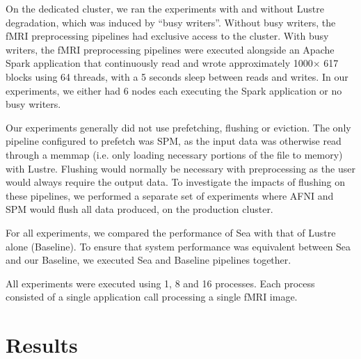 \documentclass[pdflatex,sn-mathphys-num]{sn-jnl}
\theoremstyle{thmstyleone}%
\theoremstyle{thmstyletwo}%
\theoremstyle{thmstylethree}%
\begin{document}
    On the dedicated cluster, we ran the experiments with and without
    Lustre degradation, which was induced by ``busy writers''. Without busy
    writers, the fMRI preprocessing pipelines had exclusive access to the
    cluster. With busy writers, the fMRI preprocessing pipelines were executed
    alongside an Apache Spark application that continuously read and wrote approximately
    1000$\times$ \SI{617}{\mebi\byte} blocks using 64 threads, with a 5 seconds sleep between reads
    and writes. In our experiments, we either had 6 nodes each executing the
    Spark application or no busy writers.

    Our experiments generally did not use prefetching, flushing or eviction. The
    only pipeline configured to prefetch was SPM, as the input data was otherwise
    read through a memmap (i.e. only loading necessary portions of the file to memory) 
    with Lustre. Flushing would normally be necessary with
    preprocessing as the user would always require the output data. To
    investigate the impacts of flushing on these pipelines, we performed a
    separate set of experiments where AFNI and SPM would flush all data
    produced, on the production cluster.

    For all experiments, we compared the performance of Sea with that of Lustre
    alone (Baseline). To ensure that system performance was equivalent between
    Sea and our Baseline, we executed Sea and Baseline pipelines together.
    
    All experiments were executed using 1, 8 and 16 processes.
    Each process consisted of a single application call processing a single fMRI image.
    
    \section{Results}



\end{document}
